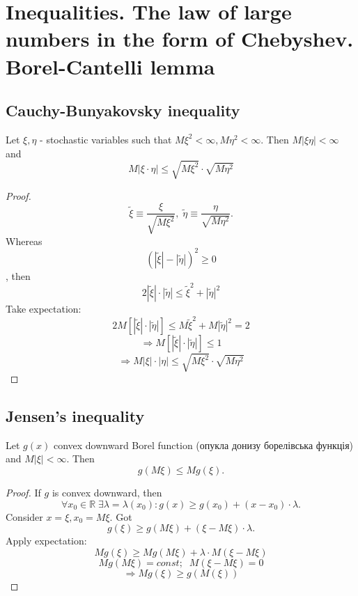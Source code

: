 \documentclass[12pt,letterpaper]{report}
\begin{document}
\chapter{Inequalities. The law of large numbers in the form of Chebyshev.
Borel-Cantelli lemma}

\section{Cauchy-Bunyakovsky inequality}

Let $\xi, \eta$ - stochastic variables such that $M\xi^2 < \infty, M\eta^2 < \infty$. Then $M|\xi \eta | < \infty$ and
\begin{equation}
    M|\xi \cdot \eta| \leq \sqrt{M\xi^2} \cdot \sqrt{M\eta^2}
\end{equation}

\begin{proof}
    \[
        \widetilde{\xi} \equiv \frac{\xi}{\sqrt{M\xi^2}}, \; \widetilde{\eta} \equiv \frac{\eta}{\sqrt{M\eta^2}}
    .\] 
    Whereas \[ (|\widetilde{\xi}| - |\widetilde{\eta}|)^2 \geq 0 \], then 
\[ 2 |\widetilde{\xi}| \cdot |\widetilde{\eta}| \leq \widetilde{\xi}^2 + |\widetilde{\eta}|^2 \]
   Take expectation:
   \[
       2 M[|\widetilde{\xi}| \cdot |\widetilde{\eta}| ] \leq M \widetilde{\xi}^2 + M|\widetilde{\eta}|^2 = 2
   \] 
   \[ \Rightarrow M[|\widetilde{\xi}|\cdot |\widetilde{\eta}| ] \leq 1 \]
   \[ \Rightarrow M |\xi| \cdot |\eta| \leq \sqrt{M\xi^2} \cdot \sqrt{M\eta^2} \]
\end{proof}

\section{Jensen's inequality}
Let $g(x)$ convex downward Borel function (опукла донизу борелівська функція) and $M|\xi| < \infty$. Then
\[
    g(M\xi) \leq Mg(\xi)
.\] 
\begin{proof}
    If $g$ is convex downward, then
    \[
        \forall x_0 \in \mathbb{R} \; \exists \lambda = \lambda(x_0) : g(x) \geq g(x_0) + (x - x_0)\cdot \lambda
    .\] 
    Consider $x = \xi, x_0 = M\xi$. Got 
    \[
        g(\xi) \geq g(M\xi) + (\xi - M\xi)\cdot \lambda
    .\] 
    Apply expectation:
    \[ Mg(\xi) \geq Mg(M\xi) + \lambda \cdot M(\xi - M\xi) \] 
    \[ Mg(M\xi) = const; \;\; M(\xi - M\xi) = 0\] 
    \[ \Rightarrow Mg(\xi) \geq g(M(\xi)) \]
\end{proof}
\end{document}
